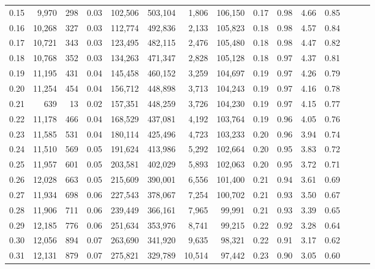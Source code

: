 \begin{tabular}{rrrrrrrrrrrrrrr}
0.15 &   9,970 &    298 &  0.03 &  102,506 &  503,104 &    1,806 &  106,150 &  0.17 &  0.98 &  4.66 &      0.85 \\
0.16 &  10,268 &    327 &  0.03 &  112,774 &  492,836 &    2,133 &  105,823 &  0.18 &  0.98 &  4.57 &      0.84 \\
0.17 &  10,721 &    343 &  0.03 &  123,495 &  482,115 &    2,476 &  105,480 &  0.18 &  0.98 &  4.47 &      0.82 \\
0.18 &  10,768 &    352 &  0.03 &  134,263 &  471,347 &    2,828 &  105,128 &  0.18 &  0.97 &  4.37 &      0.81 \\
0.19 &  11,195 &    431 &  0.04 &  145,458 &  460,152 &    3,259 &  104,697 &  0.19 &  0.97 &  4.26 &      0.79 \\
0.20 &  11,254 &    454 &  0.04 &  156,712 &  448,898 &    3,713 &  104,243 &  0.19 &  0.97 &  4.16 &      0.78 \\
0.21 &     639 &     13 &  0.02 &  157,351 &  448,259 &    3,726 &  104,230 &  0.19 &  0.97 &  4.15 &      0.77 \\
0.22 &  11,178 &    466 &  0.04 &  168,529 &  437,081 &    4,192 &  103,764 &  0.19 &  0.96 &  4.05 &      0.76 \\
0.23 &  11,585 &    531 &  0.04 &  180,114 &  425,496 &    4,723 &  103,233 &  0.20 &  0.96 &  3.94 &      0.74 \\
0.24 &  11,510 &    569 &  0.05 &  191,624 &  413,986 &    5,292 &  102,664 &  0.20 &  0.95 &  3.83 &      0.72 \\
0.25 &  11,957 &    601 &  0.05 &  203,581 &  402,029 &    5,893 &  102,063 &  0.20 &  0.95 &  3.72 &      0.71 \\
0.26 &  12,028 &    663 &  0.05 &  215,609 &  390,001 &    6,556 &  101,400 &  0.21 &  0.94 &  3.61 &      0.69 \\
0.27 &  11,934 &    698 &  0.06 &  227,543 &  378,067 &    7,254 &  100,702 &  0.21 &  0.93 &  3.50 &      0.67 \\
0.28 &  11,906 &    711 &  0.06 &  239,449 &  366,161 &    7,965 &   99,991 &  0.21 &  0.93 &  3.39 &      0.65 \\
0.29 &  12,185 &    776 &  0.06 &  251,634 &  353,976 &    8,741 &   99,215 &  0.22 &  0.92 &  3.28 &      0.64 \\
0.30 &  12,056 &    894 &  0.07 &  263,690 &  341,920 &    9,635 &   98,321 &  0.22 &  0.91 &  3.17 &      0.62 \\
0.31 &  12,131 &    879 &  0.07 &  275,821 &  329,789 &   10,514 &   97,442 &  0.23 &  0.90 &  3.05 &      0.60 \\

\end{tabular}
